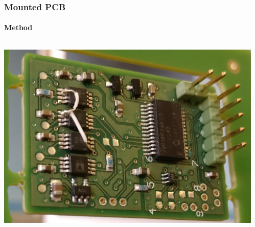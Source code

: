 \documentclass %
[																	%
	aspectratio=1610,                                               %
	11pt,															%
	hyperref={pdfpagelabels=false},									%
	xcolor	= pdftex, dvipsnames, table,							%
]																	%
{beamer}															%
\begin{document}
\begin{frame}
	\frametitle{Mounted PCB}
	\framesubtitle{Method}
	
	\begin{columns}[c] %
		\begin{column}{0.65\textwidth}
			\begin{center}
			    \includegraphics[width=\textwidth]{Images/PCB_monterad.png}
			\end{center}
		\end{column}
		\begin{column}{0.35\textwidth}
			\begin{itemize}
			\end{itemize}
		\end{column}	
    \end{columns}
    
\end{frame}
\end{document}
